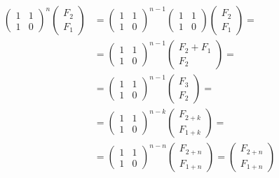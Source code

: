 \documentclass{article}[13pt]
\begin{document}
\begin{align*}
    \begin{pmatrix}
        1 & 1\\
        1 & 0
    \end{pmatrix}^n
    \begin{pmatrix}
        F_2\\
        F_1
    \end{pmatrix}&=
    \begin{pmatrix}
        1 & 1\\
        1 & 0
    \end{pmatrix}^{n-1}
    \begin{pmatrix}
        1 & 1\\
        1 & 0
    \end{pmatrix}
    \begin{pmatrix}
        F_2\\
        F_1
    \end{pmatrix}=\\
    &=
    \begin{pmatrix}
        1 & 1\\
        1 & 0
    \end{pmatrix}^{n-1}
    \begin{pmatrix}
        F_2+F_1\\
        F_2
    \end{pmatrix}=\\
    &=\begin{pmatrix}
        1 & 1\\
        1 & 0
    \end{pmatrix}^{n-1}
    \begin{pmatrix}
        F_3\\
        F_2
    \end{pmatrix}=\\
    &=\begin{pmatrix}
        1 & 1\\
        1 & 0
    \end{pmatrix}^{n-k}
    \begin{pmatrix}
        F_{2+k}\\
        F_{1+k}
    \end{pmatrix}=\\
    &=\begin{pmatrix}
        1 & 1\\
        1 & 0
    \end{pmatrix}^{n-n}
    \begin{pmatrix}
        F_{2+n}\\
        F_{1+n}
    \end{pmatrix}=\begin{pmatrix}
        F_{2+n}\\
        F_{1+n}
    \end{pmatrix}
\end{align*}
\end{document}
